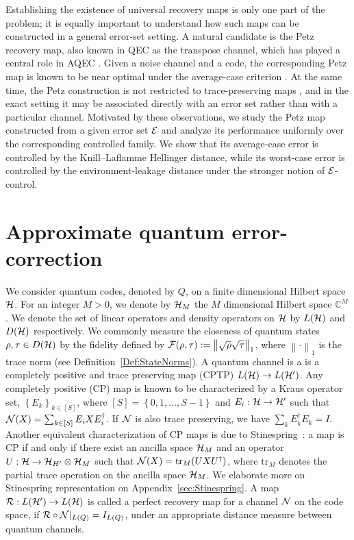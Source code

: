 \documentclass[10pt]{article}
\newcommand{\tr}{\mathrm{tr}}
\newcommand{\C}{\mathbb{C}}
\newcommand{\ppp}[1]{\left\{#1\right\}}
\newcommand{\norm}[1]{\left\|#1\right\|}
\begin{document}
Establishing the existence of universal recovery maps is only one part of the problem; it is equally important to understand how such maps can be constructed in a general error-set setting. A natural candidate is the Petz recovery map, also known in QEC as the transpose channel, which has played a central role in AQEC \cite{barnum2002reversing,ng2010simple,noh2018quantum,zheng2024near,li2025optimality,kim2026optimal}. Given a noise channel and a code, the corresponding Petz map is known to be near optimal under the average-case criterion \cite{barnum2002reversing,zheng2024near}. At the same time, the Petz construction is not restricted to trace-preserving maps \cite{barnum2002reversing,ng2010simple,afham2026projections}, and in the exact setting it may be associated directly with an error set rather than with a particular channel. Motivated by these observations, we study the Petz map constructed from a given error set ${\cal E}$ and analyze its performance uniformly over the corresponding controlled family. We show that its average-case error is controlled by the Knill--Laflamme Hellinger distance, while its worst-case error is controlled by the environment-leakage distance under the stronger notion of ${\cal E}$-control.


\section{Approximate quantum error-correction}
 We consider quantum codes, denoted by $Q$, on a finite dimensional Hilbert space ${\cal H}$. For an integer $M>0$, we denote by ${\cal H}_{M}$ the $M$ dimensional Hilbert space $\C^M$. We denote the set of linear operators and density operators on ${\cal H}$ by $L({\cal H}
)$ and $D({\cal H})$ respectively. We commonly measure the closeness of quantum states $\rho,\tau\in D({\cal H})$ by the fidelity defined by $\calF(\rho,\tau):=\norm{\sqrt{\rho}\sqrt{\tau}}_1$, where $\norm{\cdot}_1$ is the trace norm (see Definition~\ref{Def:StateNorms}). A quantum channel is a  is  a completely positive and trace preserving map (CPTP) $L({\cal H})\to L({\cal H}')$. Any completely positive (CP)  map is known to be characterized by a Kraus operator set, $\ppp{E_k}_{k\in [S]}$, where $[S]=\ppp{0,1,\dots, S-1}$ and $E_i:{\cal H}\to {\cal H}'$ such that ${\cal N}(X)=\sum_{k\in[S]}E_i X E_i^\dag$. If ${\cal N}$ is also trace preserving, we have $\sum_{k}E_k^\dag E_k=I$. Another equivalent characterization of CP maps is due to Stinespring~\cite{Stinespring1955Positive}: a map is CP if and only if there exist an ancilla space ${\cal H}_M$ and an operator $U:{\cal H}\to {\cal H}_{H'}\otimes {\cal H}_M$ such that $\calN(X)=\tr_{M}(UXU^\dag)$, where $\tr_M$ denotes the partial trace operation on the ancilla space ${\cal H}_M$. We elaborate more on Stinespring representation on Appendix~\ref{sec:Stinespring}. A map ${\cal R}:L({\cal H}')\to L({\cal H})$ is called a perfect recovery map for a channel ${\cal N}$ on the code space, if ${\cal R}\circ{\cal N}|_{L(Q)}=I_{L(Q)}$, under an appropriate distance measure between quantum channels. 
\end{document}
